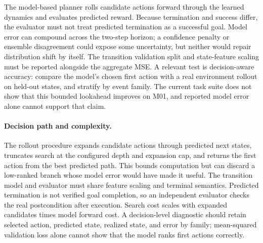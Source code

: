 The model-based planner rolls candidate actions forward through the learned dynamics and evaluates predicted reward. Because termination and success differ, the evaluator must not treat predicted termination as a successful goal. Model error can compound across the two-step horizon; a confidence penalty or ensemble disagreement could expose some uncertainty, but neither would repair distribution shift by itself. The transition validation split and state-feature scaling must be reported alongside the aggregate MSE. A relevant test is decision-aware accuracy: compare the model's chosen first action with a real environment rollout on held-out states, and stratify by event family. The current task suite does not show that this bounded lookahead improves on M01, and reported model error alone cannot support that claim.


\paragraph{Decision path and complexity.} The rollout procedure expands candidate actions through predicted next states, truncates search at the configured depth and expansion cap, and returns the first action from the best predicted path. This bounds computation but can discard a low-ranked branch whose model error would have made it useful. The transition model and evaluator must share feature scaling and terminal semantics. Predicted termination is not verified goal completion, so an independent evaluator checks the real postcondition after execution. Search cost scales with expanded candidates times model forward cost. A decision-level diagnostic should retain selected action, predicted state, realized state, and error by family; mean-squared validation loss alone cannot show that the model ranks first actions correctly.
